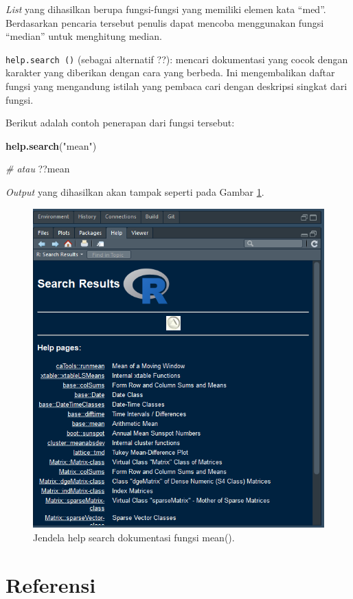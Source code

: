 \documentclass[]{book}
\newenvironment{Shaded}{\begin{snugshade}}{\end{snugshade}}
\newcommand{\CommentTok}[1]{\textcolor[rgb]{0.56,0.35,0.01}{\textit{#1}}}
\newcommand{\KeywordTok}[1]{\textcolor[rgb]{0.13,0.29,0.53}{\textbf{#1}}}
\newcommand{\NormalTok}[1]{#1}
\newcommand{\StringTok}[1]{\textcolor[rgb]{0.31,0.60,0.02}{#1}}
\theoremstyle{definition}
\theoremstyle{definition}
\theoremstyle{definition}
\theoremstyle{remark}
\begin{document}
\emph{List} yang dihasilkan berupa fungsi-fungsi yang memiliki elemen kata ``med''. Berdasarkan pencaria tersebut penulis dapat mencoba menggunakan fungsi ``median'' untuk menghitung median.

\texttt{help.search\ ()} (sebagai alternatif ??): mencari dokumentasi yang cocok dengan karakter yang diberikan dengan cara yang berbeda. Ini mengembalikan daftar fungsi yang mengandung istilah yang pembaca cari dengan deskripsi singkat dari fungsi.

Berikut adalah contoh penerapan dari fungsi tersebut:

\begin{Shaded}
\begin{Highlighting}[]
\KeywordTok{help.search}\NormalTok{(}\StringTok{"mean"}\NormalTok{)}

\CommentTok{# atau}
\NormalTok{??mean}
\end{Highlighting}
\end{Shaded}

\emph{Output} yang dihasilkan akan tampak seperti pada Gambar \ref{fig:helpsearch}.

\begin{figure}

{\centering \includegraphics[width=0.5\linewidth]{./images/helpsearch} 

}

\caption{Jendela help search dokumentasi fungsi mean().}\label{fig:helpsearch}
\end{figure}

\hypertarget{referensi}{%
\section{Referensi}\label{referensi}}
\end{document}
